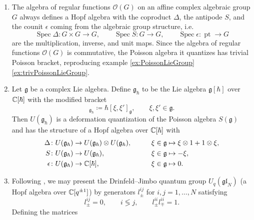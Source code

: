 \begin{example}
	\begin{enumerate}[label=(\roman*)]
		\item The algebra of regular functions $\mathcal{O}(G)$ on an affine complex algebraic group $G$ always defines a Hopf algebra with the coproduct $\Delta$, the antipode $S$, and the counit $\epsilon$ coming from the algebraic group structure, i.e.
		\begin{equation}
			\operatorname{Spec} \Delta \colon G \times G \to G, \qquad \operatorname{Spec} S \colon G \to G, \qquad \operatorname{Spec} \epsilon \colon \operatorname{pt} \to G
		\end{equation}
		are the multiplication, inverse, and unit maps. Since the algebra of regular functions $\mathcal{O}(G)$ is commutative, the Poisson algebra it quantizes has trivial Poisson bracket, reproducing example \ref{ex:PoissonLieGroup} \ref{ex:trivPoissonLieGroup}.
		\item Let $\mathfrak{g}$ be a complex Lie algebra. Define $\mathfrak{g}_\hbar$ to be the Lie algebra $\mathfrak{g}[\hbar]$ over $\mathbb{C}[\hbar]$ with the modified bracket
		\begin{equation}
			[\xi,\xi']_{\mathfrak{g}_\hbar} \coloneq \hbar [\xi,\xi']_\mathfrak{g}, \qquad \xi,\xi' \in \mathfrak{g}.
		\end{equation}
		Then $U(\mathfrak{g}_\hbar)$ is a deformation quantization of the Poisson algebra $S(\mathfrak{g})$ and has the structure of a Hopf algebra over $\mathbb{C}[\hbar]$ with
		\begin{align}
			\Delta&\colon U(\mathfrak{g}_\hbar) \to U(\mathfrak{g}_\hbar) \otimes U(\mathfrak{g}_\hbar), \qquad &&\xi \in \mathfrak{g} \mapsto \xi \otimes 1 + 1 \otimes \xi, \\
			S&\colon U(\mathfrak{g}_\hbar) \to U(\mathfrak{g}_\hbar), \qquad &&\xi \in \mathfrak{g} \mapsto -\xi, \\
			\epsilon&\colon U(\mathfrak{g}_\hbar) \to \mathbb{C}[\hbar], \qquad &&\xi \in \mathfrak{g} \mapsto 0.
		\end{align}
		\item Following \cite{faddeev_quantization_1989,alekseev_hidden_1992}, we may present the Drinfeld--Jimbo quantum group $U_q(\mathfrak{gl}_N)$ (a Hopf algebra over $\mathbb{C}[q^{\pm 1}]$) by generators $l_\pm^{ij}$ for $i,j=1,\dots,N$ satisfying
		\begin{equation}
			l_\pm^{ij} = 0, \qquad i \lessgtr j, \qquad l_\pm^{ii} l_\mp^{ii} = 1.
		\end{equation}
		Defining the matrices

\end{enumerate}
\end{example}
